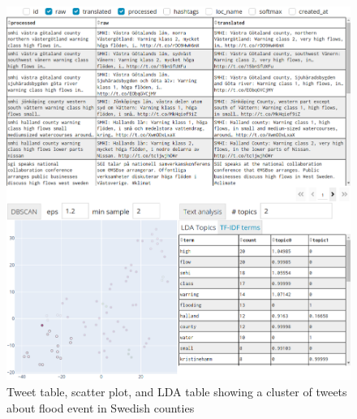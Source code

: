 \begin{figure}[H]
  \begin{center}
    \includegraphics[width=\columnwidth]{./images/4days_text_analysis.png}
  \end{center}
  \caption{Tweet table, scatter plot, and \ac{LDA} table showing a cluster of tweets about flood
  event in Swedish counties}
  \label{fig:4days_text_analysis}
\end{figure}
